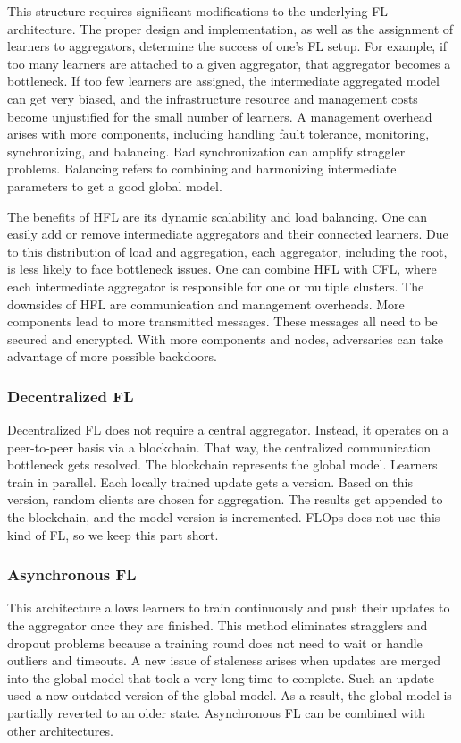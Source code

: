 This structure requires significant modifications to the underlying FL architecture.
The proper design and implementation, as well as the assignment of learners to aggregators, determine the success of one's FL setup.
For example, if too many learners are attached to a given aggregator, that aggregator becomes a bottleneck.
If too few learners are assigned, the intermediate aggregated model can get very biased, and the infrastructure resource and management costs become unjustified for the small number of learners.
A management overhead arises with more components, including handling fault tolerance, monitoring, synchronizing, and balancing.
Bad synchronization can amplify straggler problems.
Balancing refers to combining and harmonizing intermediate parameters to get a good global model.

The benefits of HFL are its dynamic scalability and load balancing.
One can easily add or remove intermediate aggregators and their connected learners.
Due to this distribution of load and aggregation, each aggregator, including the root, is less likely to face bottleneck issues.
One can combine HFL with CFL, where each intermediate aggregator is responsible for one or multiple clusters.
The downsides of HFL are communication and management overheads.
More components lead to more transmitted messages.
These messages all need to be secured and encrypted.
With more components and nodes, adversaries can take advantage of more possible backdoors.

\subsubsection{Decentralized FL}
Decentralized FL does not require a central aggregator.
Instead, it operates on a peer-to-peer basis via a blockchain.
That way, the centralized communication bottleneck gets resolved.
The blockchain represents the global model.
Learners train in parallel.
Each locally trained update gets a version.
Based on this version, random clients are chosen for aggregation.
The results get appended to the blockchain, and the model version is incremented.
FLOps does not use this kind of FL, so we keep this part short.

\subsubsection{Asynchronous FL}
This architecture allows learners to train continuously and push their updates to the aggregator once they are finished.
This method eliminates stragglers and dropout problems because a training round does not need to wait or handle outliers and timeouts.
A new issue of staleness arises when updates are merged into the global model that took a very long time to complete.
Such an update used a now outdated version of the global model.
As a result, the global model is partially reverted to an older state.
Asynchronous FL can be combined with other architectures.